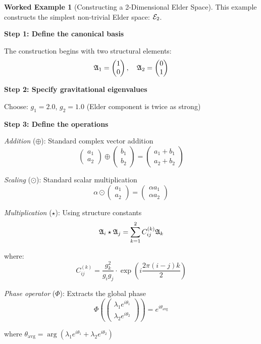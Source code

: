 \documentclass[12pt,a4paper]{article}
\theoremstyle{definition}
\newtheorem{example}{Worked Example}[section]
\theoremstyle{remark}
\begin{document}
\begin{example}[Constructing a 2-Dimensional Elder Space]
This example constructs the simplest non-trivial Elder space: $\mathcal{E}_{2}$.

\textbf{Step 1: Define the canonical basis}

The construction begins with two structural elements:
$$\mathfrak{A}_{1} = \begin{pmatrix} 1 \\ 0 \end{pmatrix}, \quad \mathfrak{A}_{2} = \begin{pmatrix} 0 \\ 1 \end{pmatrix}$$

\textbf{Step 2: Specify gravitational eigenvalues}

Choose: $g_1 = 2.0$, $g_2 = 1.0$ (Elder component is twice as strong)

\textbf{Step 3: Define the operations}

\textit{Addition} ($\oplus$): Standard complex vector addition
$$\begin{pmatrix} a_1 \\ a_2 \end{pmatrix} \oplus \begin{pmatrix} b_1 \\ b_2 \end{pmatrix} = \begin{pmatrix} a_1 + b_1 \\ a_2 + b_2 \end{pmatrix}$$

\textit{Scaling} ($\odot$): Standard scalar multiplication
$$\alpha \odot \begin{pmatrix} a_1 \\ a_2 \end{pmatrix} = \begin{pmatrix} \alpha a_1 \\ \alpha a_2 \end{pmatrix}$$

\textit{Multiplication} ($\star$): Using structure constants
$$\mathfrak{A}_{i} \star \mathfrak{A}_{j} = \sum_{k=1}^{2} C_{ij}^{(k)} \mathfrak{A}_{k}$$

where:
$$C_{ij}^{(k)} = \frac{g_k^2}{g_i g_j} \cdot \exp\left(i\frac{2\pi(i-j)k}{2}\right)$$

\textit{Phase operator} ($\Phi$): Extracts the global phase
$$\Phi\left(\begin{pmatrix} \lambda_1 e^{i\theta_1} \\ \lambda_2 e^{i\theta_2} \end{pmatrix}\right) = e^{i\theta_{\text{avg}}}$$

where $\theta_{\text{avg}} = \arg(\lambda_1 e^{i\theta_1} + \lambda_2 e^{i\theta_2})$
\end{example}
\end{document}
